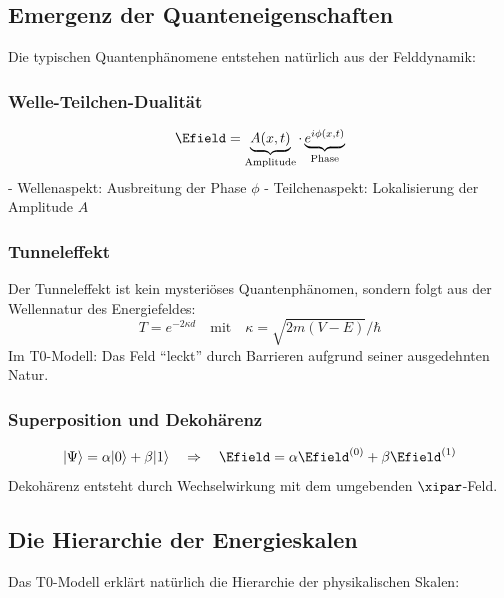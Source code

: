 	\subsection{Emergenz der Quanteneigenschaften}
	
	Die typischen Quantenphänomene entstehen natürlich aus der Felddynamik:
	
	\subsubsection{Welle-Teilchen-Dualität}
	\begin{equation}
		\Efield = \underbrace{A(x,t)}_{\text{Amplitude}} \cdot \underbrace{e^{i\phi(x,t)}}_{\text{Phase}}
	\end{equation}
	- Wellenaspekt: Ausbreitung der Phase $\phi$
	- Teilchenaspekt: Lokalisierung der Amplitude $A$
	
	\subsubsection{Tunneleffekt}
	Der Tunneleffekt ist kein mysteriöses Quantenphänomen, sondern folgt aus der Wellennatur des Energiefeldes:
	\begin{equation}
		T = e^{-2\kappa d} \quad \text{mit} \quad \kappa = \sqrt{2m(V-E)}/\hbar
	\end{equation}
	Im T0-Modell: Das Feld ``leckt'' durch Barrieren aufgrund seiner ausgedehnten Natur.
	
	\subsubsection{Superposition und Dekohärenz}
	\begin{equation}
		|\Psi\rangle = \alpha|0\rangle + \beta|1\rangle \quad \Rightarrow \quad \Efield = \alpha \Efield^{(0)} + \beta \Efield^{(1)}
	\end{equation}
	Dekohärenz entsteht durch Wechselwirkung mit dem umgebenden $\xipar$-Feld.
	
	\subsection{Die Hierarchie der Energieskalen}
	
	Das T0-Modell erklärt natürlich die Hierarchie der physikalischen Skalen:
	
